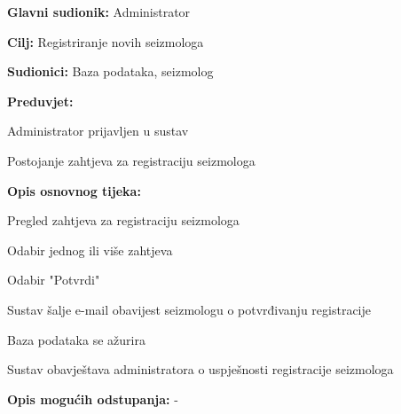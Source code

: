 					\noindent {}
					\begin{packed_item}
	
						\item \textbf{Glavni sudionik:} Administrator
						\item \textbf{Cilj:} Registriranje novih seizmologa
						\item \textbf{Sudionici:} Baza podataka, seizmolog
						\item \textbf{Preduvjet:} 
							\begin{packed_item}
								\item Administrator prijavljen u sustav
								\item Postojanje zahtjeva za registraciju seizmologa
							\end{packed_item}
						\item  \textbf{Opis osnovnog tijeka:}
						
						\item[] \begin{packed_enum}
	
							\item Pregled zahtjeva za registraciju seizmologa
							\item Odabir jednog ili više zahtjeva
							\item Odabir "Potvrdi"
							\item Sustav šalje e-mail obavijest seizmologu o potvrđivanju registracije
							\item Baza podataka se ažurira
							\item Sustav obavještava administratora o uspješnosti registracije seizmologa
							
						\end{packed_enum}
						
						\item  \textbf{Opis mogućih odstupanja:} -
						
					\end{packed_item}

